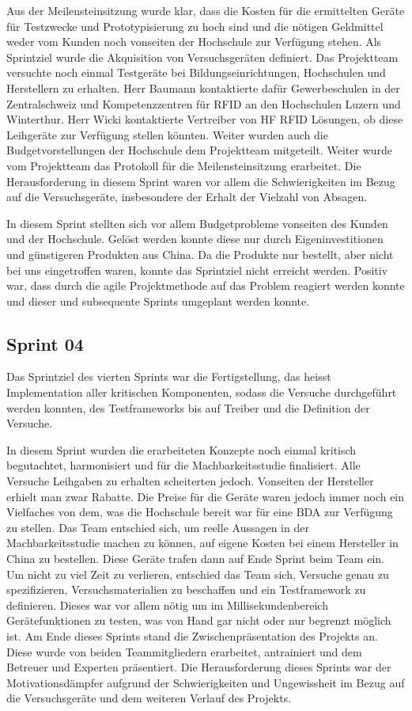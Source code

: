 Aus der Meilensteinsitzung wurde klar, dass die Kosten für die ermittelten Geräte für Testzwecke und Prototypisierung zu hoch sind und die nötigen Geldmittel weder vom Kunden noch vonseiten der Hochschule zur Verfügung stehen. Als Sprintziel wurde die Akquisition von Versuchsgeräten definiert. Das Projektteam versuchte noch einmal Testgeräte bei Bildungseinrichtungen, Hochschulen und Herstellern zu erhalten. Herr Baumann kontaktierte dafür Gewerbeschulen in der Zentralschweiz und Kompetenzzentren für RFID an den Hochschulen Luzern und Winterthur. Herr Wicki kontaktierte Vertreiber von HF RFID Lösungen, ob diese Leihgeräte zur Verfügung stellen könnten. Weiter wurden auch die Budgetvorstellungen der Hochschule dem Projektteam mitgeteilt. Weiter wurde vom Projektteam das Protokoll für die Meilensteinsitzung erarbeitet. Die Herausforderung in diesem Sprint waren vor allem die Schwierigkeiten im Bezug auf die Versuchsgeräte, insbesondere der Erhalt der Vielzahl von Absagen.

In diesem Sprint stellten sich vor allem Budgetprobleme vonseiten des Kunden und der Hochschule. Gelöst werden konnte diese nur durch Eigeninvestitionen und günstigeren Produkten aus China. Da die Produkte nur bestellt, aber nicht bei uns eingetroffen waren, konnte das Sprintziel nicht erreicht werden. Positiv war, dass durch die agile Projektmethode auf das Problem reagiert werden konnte und dieser und subsequente Sprints umgeplant werden konnte.

\subsection{Sprint 04}
Das Sprintziel des vierten Sprints war die Fertigstellung, das heisst Implementation aller kritischen Komponenten, sodass die Versuche durchgeführt werden konnten, des Testframeworks bis auf Treiber und die Definition der Versuche.

In diesem Sprint wurden die erarbeiteten Konzepte noch einmal kritisch begutachtet, harmonisiert und für die Machbarkeitsstudie finalisiert. Alle Versuche Leihgaben zu erhalten scheiterten jedoch. Vonseiten der Hersteller erhielt man zwar Rabatte. Die Preise für die Geräte waren jedoch immer noch ein Vielfaches von dem, was die Hochschule bereit war für eine BDA zur Verfügung zu stellen. Das Team entschied sich, um reelle Aussagen in der Machbarkeitsstudie machen zu können, auf eigene Kosten bei einem Hersteller in China zu bestellen. Diese Geräte trafen dann auf Ende Sprint beim Team ein. Um nicht zu viel Zeit zu verlieren, entschied das Team sich, Versuche genau zu spezifizieren, Versuchsmaterialien zu beschaffen und ein Testframework zu definieren. Dieses war vor allem nötig um im Millisekundenbereich Gerätefunktionen zu testen, was von Hand gar nicht oder nur begrenzt möglich ist. Am Ende dieses Sprints stand die Zwischenpräsentation des Projekts an. Diese wurde von beiden Teammitgliedern erarbeitet, antrainiert und dem Betreuer und Experten präsentiert. Die Herausforderung dieses Sprints war der Motivationsdämpfer aufgrund der Schwierigkeiten und Ungewissheit im Bezug auf die Versuchsgeräte und dem weiteren Verlauf des Projekts.


